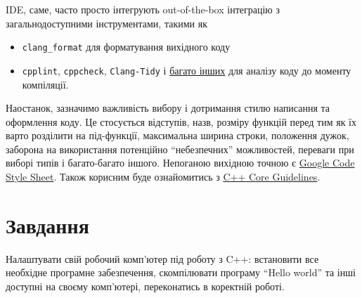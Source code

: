 \documentclass[12pt]{article}
\begin{document}
	IDE, саме, часто просто інтегрують out-of-the-box інтеграцію з загальнодоступними інструментами, такими як
	\begin{itemize}
		\item \texttt{clang\_format} для форматування вихідного коду
		\item \texttt{cpplint}, \texttt{cppcheck}, \texttt{Clang-Tidy} і \href{https://en.wikipedia.org/wiki/List_of_tools_for_static_code_analysis#C,_C++}{багато інших} для аналізу коду до моменту компіляції.
	\end{itemize}

	Наостанок, зазначимо важливість вибору і дотримання стилю написання та оформлення коду. Це стосується відступів, назв, розміру функцій перед тим як їх варто розділити на під-функції, максимальна ширина строки, положення дужок, заборона на використання потенційно ``небезпечних'' можливостей, переваги при виборі типів і багато-багато іншого. Непоганою вихідною точною є \href{https://google.github.io/styleguide/cppguide.html}{Google Code Style Sheet}. Також корисним буде ознайомитись з \href{https://github.com/isocpp/CppCoreGuidelines}{C++ Core Guidelines}.

	\section*{Завдання}
	
	Налаштувати свій робочий комп'ютер під роботу з C++: встановити все необхідне програмне забезпечення, скомпілювати програму ``Hello world'' та інші доступні на своєму комп'ютері, переконатись в коректній роботі.
\end{document}
